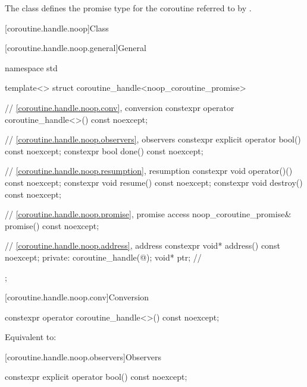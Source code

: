 \begin{itemdescr}
\pnum
The class  defines the promise type for
the coroutine referred to
by .
\end{itemdescr}

[coroutine.handle.noop]{Class }

[coroutine.handle.noop.general]{General}

%
\begin{codeblock}
namespace std {
  template<>
  struct coroutine_handle<noop_coroutine_promise>
  {
    // \ref{coroutine.handle.noop.conv}, conversion
    constexpr operator coroutine_handle<>() const noexcept;

    // \ref{coroutine.handle.noop.observers}, observers
    constexpr explicit operator bool() const noexcept;
    constexpr bool done() const noexcept;

    // \ref{coroutine.handle.noop.resumption}, resumption
    constexpr void operator()() const noexcept;
    constexpr void resume() const noexcept;
    constexpr void destroy() const noexcept;

    // \ref{coroutine.handle.noop.promise}, promise access
    noop_coroutine_promise& promise() const noexcept;

    // \ref{coroutine.handle.noop.address}, address
    constexpr void* address() const noexcept;
  private:
    coroutine_handle(@\unspec@);
    void* ptr;  // \expos
  };
}
\end{codeblock}

[coroutine.handle.noop.conv]{Conversion}

%
\begin{itemdecl}
constexpr operator coroutine_handle<>() const noexcept;
\end{itemdecl}

\begin{itemdescr}
\pnum
\effects
Equivalent to: 
\end{itemdescr}

[coroutine.handle.noop.observers]{Observers}

%
\begin{itemdecl}
constexpr explicit operator bool() const noexcept;
\end{itemdecl}

